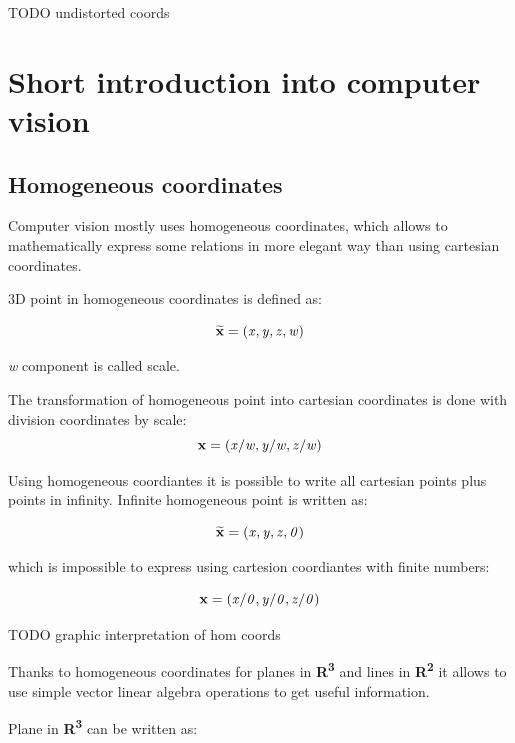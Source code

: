 \documentclass[a4paper,12pt]{report}
\newcommand{\evect}[1]{
{\bf #1}
}
\newcommand{\ehvect}[1]{
{\bf \widetilde{#1}}
}
\newcommand{\escal}[1]{
{\it #1}
}
\newcommand{\eucl}[1]{
{\bf R\textsuperscript{#1}}
}
\begin{document}
TODO undistorted coords

\section{Short introduction into computer vision}

\subsection{Homogeneous coordinates}

Computer vision mostly uses homogeneous coordinates, which allows to mathematically express some relations
 in more elegant way than using cartesian coordinates. 

3D point in homogeneous coordinates is defined as:

\begin{equation}
\ehvect{x} = (\escal{x}, \escal{y}, \escal{z}, \escal{w})
\end{equation}

\escal{w} component is called scale.

The transformation of homogeneous point into cartesian coordinates is done with division 
coordinates by scale:
\begin{equation}
\evect{x} = (\escal{x} / \escal{w}, \escal{y} / \escal{w}, \escal{z} / \escal{w})
\end{equation}

Using homogeneous coordiantes it is possible to write all cartesian points plus points in infinity.
Infinite homogeneous point is written as: 

\begin{equation}
\ehvect{x} = (\escal{x}, \escal{y}, \escal{z}, \escal{0})
\end{equation}

which is impossible to express using cartesion coordiantes with finite numbers:

\begin{equation}
\evect{x} = (\escal{x} / \escal{0}, \escal{y} / \escal{0}, \escal{z} / \escal{0})
\end{equation}

TODO graphic interpretation of hom coords 

Thanks to homogeneous coordinates for planes in \eucl{3} and lines in \eucl{2} it allows to 
use simple vector linear algebra operations 
to get useful information.

Plane in \eucl{3} can be written as:
\end{document}

